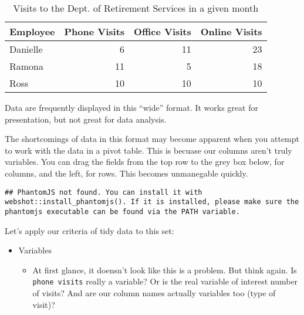 \documentclass[]{book}
\newenvironment{Shaded}{\begin{snugshade}}{\end{snugshade}}
\newcommand{\KeywordTok}[1]{\textcolor[rgb]{0.13,0.29,0.53}{\textbf{#1}}}
\newcommand{\DataTypeTok}[1]{\textcolor[rgb]{0.13,0.29,0.53}{#1}}
\newcommand{\StringTok}[1]{\textcolor[rgb]{0.31,0.60,0.02}{#1}}
\newcommand{\OperatorTok}[1]{\textcolor[rgb]{0.81,0.36,0.00}{\textbf{#1}}}
\newcommand{\NormalTok}[1]{#1}
\providecommand{\tightlist}{%
  \setlength{\itemsep}{0pt}\setlength{\parskip}{0pt}}
\begin{document}
\begin{table}

\caption{\label{tab:tables-visits}Visits to the Dept. of Retirement Services in a given month}
\centering
\begin{tabular}[t]{l|r|r|r}
\hline
Employee & Phone Visits & Office Visits & Online Visits\\
\hline
Danielle & 6 & 11 & 23\\
\hline
Ramona & 11 & 5 & 18\\
\hline
Ross & 10 & 10 & 10\\
\hline
\end{tabular}
\end{table}

Data are frequently displayed in this ``wide'' format. It works great
for presentation, but not great for data analysis.

The shortcomings of data in this format may become apparent when you
attempt to work with the data in a pivot table. This is becuase our
columns aren't truly variables. You can drag the fields from the top row
to the grey box below, for columns, and the left, for rows. This becomes
unmanegable quickly.

\begin{Shaded}
\end{Shaded}

\begin{verbatim}
## PhantomJS not found. You can install it with webshot::install_phantomjs(). If it is installed, please make sure the phantomjs executable can be found via the PATH variable.
\end{verbatim}

\hypertarget{htmlwidget-b3c5c980feccc9082544}{}

Let's apply our criteria of tidy data to this set:

\begin{itemize}
\tightlist
\item
  Variables

  \begin{itemize}
  \tightlist
  \item
    At first glance, it doensn't look like this is a problem. But think
    again. Is \texttt{phone\ visits} really a variable? Or is the real
    variable of interest number of visits? And are our column names
    actually variables too (type of visit)?
  \end{itemize}
\end{itemize}
\end{document}
